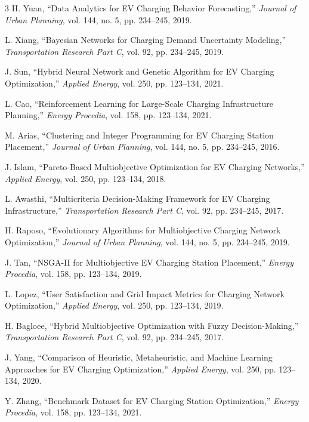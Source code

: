 \documentclass[journal]{IEEEtran}
\begin{document}
\begin{thebibliography}{3}
H. Yuan, ``Data Analytics for EV Charging Behavior Forecasting,'' \emph{Journal of Urban Planning}, vol. 144, no. 5, pp. 234--245, 2019.

L. Xiang, ``Bayesian Networks for Charging Demand Uncertainty Modeling,'' \emph{Transportation Research Part C}, vol. 92, pp. 234--245, 2019.

J. Sun, ``Hybrid Neural Network and Genetic Algorithm for EV Charging Optimization,'' \emph{Applied Energy}, vol. 250, pp. 123--134, 2021.

L. Cao, ``Reinforcement Learning for Large-Scale Charging Infrastructure Planning,'' \emph{Energy Procedia}, vol. 158, pp. 123--134, 2021.

M. Arias, ``Clustering and Integer Programming for EV Charging Station Placement,'' \emph{Journal of Urban Planning}, vol. 144, no. 5, pp. 234--245, 2016.

J. Islam, ``Pareto-Based Multiobjective Optimization for EV Charging Networks,'' \emph{Applied Energy}, vol. 250, pp. 123--134, 2018.

L. Awasthi, ``Multicriteria Decision-Making Framework for EV Charging Infrastructure,'' \emph{Transportation Research Part C}, vol. 92, pp. 234--245, 2017.

H. Raposo, ``Evolutionary Algorithms for Multiobjective Charging Network Optimization,'' \emph{Journal of Urban Planning}, vol. 144, no. 5, pp. 234--245, 2019.

J. Tan, ``NSGA-II for Multiobjective EV Charging Station Placement,'' \emph{Energy Procedia}, vol. 158, pp. 123--134, 2019.

L. Lopez, ``User Satisfaction and Grid Impact Metrics for Charging Network Optimization,'' \emph{Applied Energy}, vol. 250, pp. 123--134, 2019.

H. Bagloee, ``Hybrid Multiobjective Optimization with Fuzzy Decision-Making,'' \emph{Transportation Research Part C}, vol. 92, pp. 234--245, 2017.

J. Yang, ``Comparison of Heuristic, Metaheuristic, and Machine Learning Approaches for EV Charging Optimization,'' \emph{Applied Energy}, vol. 250, pp. 123--134, 2020.

Y. Zhang, ``Benchmark Dataset for EV Charging Station Optimization,'' \emph{Energy Procedia}, vol. 158, pp. 123--134, 2021.


\end{thebibliography}
\end{document}
